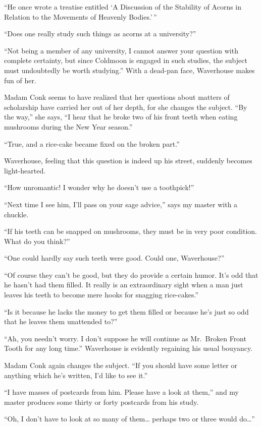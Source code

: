 \documentclass{book}
\begin{document}
``He once wrote a treatise entitled `A Discussion of the Stability of
Acorns in Relation to the Movements of Heavenly Bodies.'\,''

``Does one really study such things as acorns at a university?''

``Not being a member of any university, I cannot answer your question
with complete certainty, but since Coldmoon is engaged in such studies,
the subject must undoubtedly be worth studying.'' With a dead-pan face,
Waverhouse makes fun of her.

Madam Conk seems to have realized that her questions about matters of
scholarship have carried her out of her depth, for she changes the
subject. ``By the way,'' she says, ``I hear that he broke two of his
front teeth when eating mushrooms during the New Year season.''

``True, and a rice-cake became fixed on the broken part.''

Waverhouse, feeling that this question is indeed up his street, suddenly
becomes light-hearted.

``How unromantic! I wonder why he doesn't use a toothpick!''

``Next time I see him, I'll pass on your sage advice,'' says my master
with a chuckle.

``If his teeth can be snapped on mushrooms, they must be in very poor
condition. What do you think?''

``One could hardly say such teeth were good. Could one, Waverhouse?''

``Of course they can't be good, but they do provide a certain humor.
It's odd that he hasn't had them filled. It really is an extraordinary
sight when a man just leaves his teeth to become mere hooks for snagging
rice-cakes.''

``Is it because he lacks the money to get them filled or because he's
just so odd that he leaves them unattended to?''

``Ah, you needn't worry. I don't suppose he will continue as Mr.~Broken
Front Tooth for any long time.'' Waverhouse is evidently regaining his
usual bouyancy.

Madam Conk again changes the subject. ``If you should have some letter
or anything which he's written, I'd like to see it.''

``I have masses of postcards from him. Please have a look at them,'' and
my master produces some thirty or forty postcards from his study.

``Oh, I don't have to look at so many of them\ldots{} perhaps two or
three would do\ldots{}''
\end{document}
